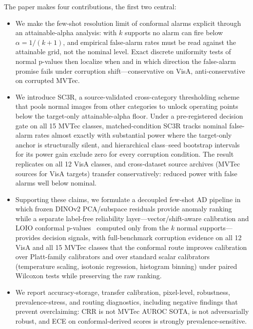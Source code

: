 The paper makes four contributions, the first two central:
\begin{itemize}
    \item We make the few-shot resolution limit of conformal alarms explicit through an attainable-alpha analysis: with $k$ supports no alarm can fire below $\alpha=1/(k{+}1)$, and empirical false-alarm rates must be read against the attainable grid, not the nominal level. Exact discrete uniformity tests of normal p-values then localize when and in which direction the false-alarm promise fails under corruption shift---conservative on VisA, anti-conservative on corrupted MVTec.
    \item We introduce SC3R, a source-validated cross-category thresholding scheme that pools normal images from other categories to unlock operating points below the target-only attainable-alpha floor. Under a pre-registered decision gate on all 15 MVTec classes, matched-condition SC3R tracks nominal false-alarm rates almost exactly with substantial power where the target-only anchor is structurally silent, and hierarchical class--seed bootstrap intervals for its power gain exclude zero for every corruption condition. The result replicates on all 12 VisA classes, and cross-dataset source archives (MVTec sources for VisA targets) transfer conservatively: reduced power with false alarms well below nominal.
    \item Supporting these claims, we formulate a decoupled few-shot AD pipeline in which frozen DINOv2 PCA/subspace residuals provide anomaly ranking while a separate label-free reliability layer---vector/shift-aware calibration and LOIO conformal p-values~\cite{hennhofer2024loio} computed only from the $k$ normal supports---provides decision signals, with full-benchmark corruption evidence on all 12 VisA and all 15 MVTec classes that the conformal route improves calibration over Platt-family calibrators and over standard scalar calibrators (temperature scaling, isotonic regression, histogram binning) under paired Wilcoxon tests while preserving the raw ranking.
    \item We report accuracy-storage, transfer calibration, pixel-level, robustness, prevalence-stress, and routing diagnostics, including negative findings that prevent overclaiming: CRR is not MVTec AUROC SOTA, is not adversarially robust, and ECE on conformal-derived scores is strongly prevalence-sensitive.
\end{itemize}
